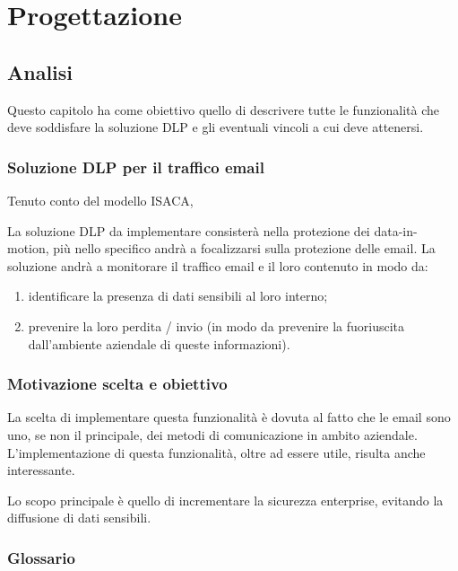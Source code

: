 \chapter{Progettazione}

\section{Analisi}
  Questo capitolo ha come obiettivo quello di descrivere tutte le funzionalità che deve soddisfare la 
  soluzione DLP e gli eventuali vincoli a cui deve attenersi.

  \subsection{Soluzione DLP per il traffico email}
  Tenuto conto del modello ISACA,

  La soluzione DLP da implementare consisterà nella protezione dei data-in-motion, più nello specifico
  andrà a focalizzarsi sulla protezione delle email. La soluzione andrà a monitorare il traffico email e
  il loro contenuto in modo da:

  \begin{enumerate}
      \item {identificare la presenza di dati sensibili al loro interno;}
      \item {prevenire la loro perdita / 
      invio (in modo da prevenire la fuoriuscita dall’ambiente aziendale di queste informazioni).}
  \end{enumerate}

  \subsection{Motivazione scelta e obiettivo}
  La scelta di implementare questa funzionalità è dovuta al fatto che le email sono uno, 
  se non il principale, dei metodi di comunicazione in ambito aziendale.
  L’implementazione di questa funzionalità, oltre ad essere utile, risulta anche interessante.

  Lo scopo principale è quello di incrementare la sicurezza enterprise,  
  evitando la diffusione di dati sensibili.

  \pagebreak
  \subsection{Glossario}

